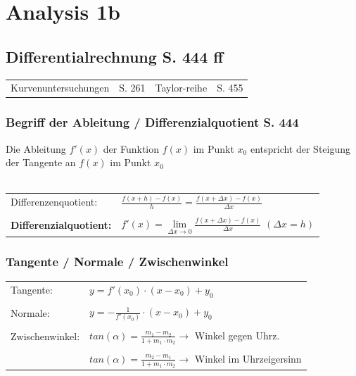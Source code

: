 \section{Analysis 1b}
	\subsection{Differentialrechnung S. 444 ff}

				\begin{tabular}{llll} 
				Kurvenuntersuchungen & S. 261 & Taylor-reihe & S. 455 \\
				\end{tabular}
				
				
			\subsubsection{Begriff der Ableitung / Differenzialquotient S. 444}
			Die Ableitung $f'(x)$ der Funktion $f(x)$ im Punkt $x_0$ entspricht der Steigung der Tangente an	$f(x)$ im Punkt $x_0$		 \\
			\\
			\begin{tabular}{ll}
			Differenzenquotient: & $\frac{f(x + h) - f(x)}{h} = \frac{f(x + \Delta x) - f(x)}{\Delta x}$ \\
			\\
			\textbf{Differenzialquotient:} & $f'(x) = \lim\limits_{\Delta x \to 0} \frac{f(x + \Delta x) - f(x)}{\Delta x}$ \quad $(\Delta x = h)$ \\
			\end{tabular}
			

			\subsubsection{Tangente / Normale / Zwischenwinkel}
			\begin{tabular}{ll}
			Tangente: & $y = f'(x_0) \cdot (x - x_0) + y_0$ \\
			\\
			Normale: & $y = -\frac{1}{f'(x_0)} \cdot (x - x_0) + y_0$ \\	
			\\
			Zwischenwinkel: &  $tan(\alpha) = \frac{m_1 - m_2}{1 + m_1 \cdot m_2} \rightarrow$ Winkel gegen Uhrz.\\
			\\
			&  $tan(\alpha) =  \frac{m_2 - m_1}{1 + m_1 \cdot m_2} \rightarrow$ Winkel im Uhrzeigersinn\\
			
			\end{tabular}
			
